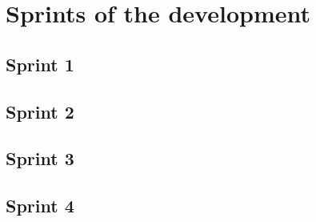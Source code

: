 \chapter{Sprints of the development}
\section{Sprint 1}

\section{Sprint 2}
\section{Sprint 3}
\section{Sprint 4}